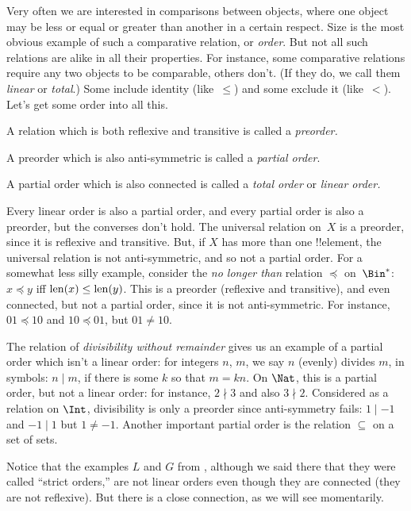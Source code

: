 \documentclass[../../../include/open-logic-section]{subfiles}
\begin{document}

\begin{explain}
Very often we are interested in comparisons between objects, where one
object may be less or equal or greater than another in a certain
respect.  Size is the most obvious example of such a comparative
relation, or \emph{order}. But not all such relations are alike in all
their properties. For instance, some comparative relations require any
two objects to be comparable, others don't. (If they do, we call them
\emph{linear} or \emph{total}.) Some include identity (like~$\le$) and
some exclude it (like~$<$). Let's get some order into all this.
\end{explain}

\begin{defn}[Preorder]
A relation which is both reflexive and transitive is called a
\emph{preorder.}  
\end{defn}

\begin{defn}
A preorder which is also anti-symmetric is called a
\emph{partial order}.
\end{defn}

\begin{defn}
A partial order which is also connected is called a
\emph{total order} or \emph{linear order.}
\end{defn}

\begin{ex}
Every linear order is also a partial order, and every partial order is
also a preorder, but the converses don't hold. The universal relation
on~$X$ is a preorder, since it is reflexive and transitive. But, if
$X$ has more than one !!{element}, the universal relation is not
anti-symmetric, and so not a partial order.  For a somewhat less silly
example, consider the \emph{no longer than} relation $\preccurlyeq$
on~$\Bin^*$: $x \preccurlyeq y$ iff $\mathrm{len}(x) \le \mathrm{len}(y)$. This is a
preorder (reflexive and transitive), and even connected, but not a
partial order, since it is not anti-symmetric. For instance, $01
\preccurlyeq 10$ and $10 \preccurlyeq 01$, but $01 \neq 10$.

The relation of \emph{divisibility without remainder} gives us an
example of a partial order which isn't a linear order: for integers
$n$, $m$, we say $n$ (evenly) divides $m$, in symbols: $n\mid m$, if
there is some $k$ so that $m=kn$. On $\Nat$, this is a partial order,
but not a linear order: for instance, $2\nmid3$ and also
$3\nmid2$. Considered as a relation on $\Int$, divisibility is only a
preorder since anti-symmetry fails: $1\mid-1$ and $-1\mid1$ but
$1\neq-1$. Another important partial order is the relation $\subseteq$
on a set of sets.

Notice that the examples $L$ and $G$ from ,
although we said there that they were called ``strict orders,'' are not
linear orders even though they are connected (they are not
reflexive). But there is a close connection, as we will see
momentarily.
\end{ex}
\end{document}
